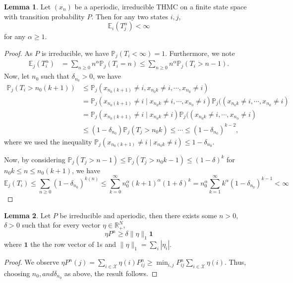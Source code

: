 \documentclass[]{article}
\theoremstyle{definition}
\theoremstyle{definition}
\newtheorem{lemma}{Lemma}[section]
\begin{document}
\begin{lemma}
  Let \((x_n)\) be a aperiodic, irreducible THMC on a finite state space with 
  transition probability \(P\). Then for any two states \(i, j\), 
  \[\mathbb{E}_i(T_j^\alpha) < \infty\]
  for any \(\alpha \ge 1\).
\end{lemma}
\begin{proof}
  As \(P\) is irreducible, we have \(\mathbb{P}_j(T_i < \infty) = 1\). 
  Furthermore, we note
  \[\begin{split}
    \mathbb{E}_j(T_i^\alpha) & = \sum_{n \ge 0}n^\alpha\mathbb{P}_j(T_i = n) 
      \le \sum_{n \ge 0} n^\alpha \mathbb{P}_j(T_i > n - 1).
  \end{split}\]
  Now, let \(n_0\) such that \(\delta_{n_0} > 0\), we have 
  \[\begin{split}
    \mathbb{P}_j(T_i > n_0(k + 1))
    & \le \mathbb{P}_j(x_{n_0(k + 1)} \neq i, x_{n_0k} \neq i, \cdots, x_{n_0} \neq i)\\
    & = \mathbb{P}_j(x_{n_0(k + 1)} \neq i \mid x_{n_0k} \neq i, \cdots, x_{n_0} \neq i)
      \mathbb{P}_j((x_{n_0k} \neq i, \cdots, x_{n_0} \neq i)\\
    & = \mathbb{P}_j(x_{n_0(k + 1)} \neq i \mid x_{n_0k} \neq i)
      \mathbb{P}_j((x_{n_0k} \neq i, \cdots, x_{n_0} \neq i)\\
    & \le (1 - \delta_{n_0})\mathbb{P}_j(T_j > n_0k) \le \cdots \le (1 - \delta_{n_0})^{k - 2},
  \end{split}\]
  where we used the inequality 
  \(\mathbb{P}_j(x_{n_0(k + 1)} \neq i \mid x_{n_0k} \neq i) \le 1 - \delta_{n_0}\).

  Now, by considering \(\mathbb{P}_j(T_j > n - 1) \le \mathbb{P}_j(T_j > n_0 k - 1)
  \le (1 - \delta)^k\) for \(n_0 k \le n \le n_0(k + 1)\), we have 
  \[\mathbb{E}_j(T_i) \le \sum_{n \ge 0}(1 - \delta_{n_0})^{k(n)}
    \le \sum_{k = 0}^\infty n_0^\alpha(k + 1)^\alpha (1 + \delta)^k 
    = n_0^\alpha \sum_{k = 1}^\infty k^\alpha (1 - \delta_{n_0})^{k - 1}
    < \infty\]
\end{proof}

\begin{lemma}
  Let \(P\) be irreducible and aperiodic, then there exists some \(n > 0\), 
  \(\delta > 0\) such that for every vector \(\eta \in \mathbb{R}_+^N\), 
  \[\eta P^n \ge \delta \|\eta\|_1 \mathbf{1}\]
  where \(\mathbf{1}\) the the row vector of 1s and \(\|\eta\|_1 = \sum_i |\eta_i|\).
\end{lemma}
\begin{proof}
  We observe
  \(\eta P^n(j) = \sum_{i \in \mathcal{X}} \eta(i)P^n_{ij} \ge 
  \min_{i, j}P^n_{ij} \sum_{i \in \mathcal{X}} \eta(i)\). Thus, choosing 
  \(n_0, and \delta_{n_0}\) as above, the result follows.
\end{proof}
\end{document}
